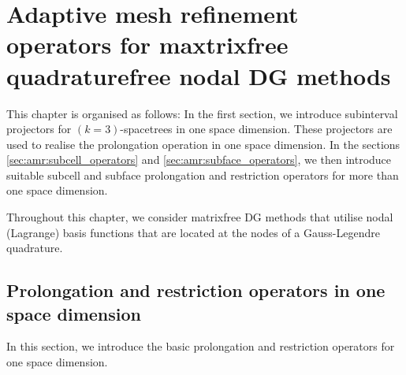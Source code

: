 \documentclass{scrreprt}
\theoremstyle{definition}
\theoremstyle{nonumberplain}
\begin{document}
\chapter{Adaptive mesh refinement operators for 
maxtrixfree quadraturefree nodal DG
methods}
\label{ch:amr}
This chapter is organised as follows:
In the first section, we introduce subinterval projectors
for $(k=3)$-spacetrees in one space dimension.
These projectors are used to realise the
prolongation operation in one space dimension.
In the sections \ref{sec:amr:subcell_operators}
and \ref{sec:amr:subface_operators},
we then introduce suitable subcell and subface
prolongation and restriction operators for more
than one space dimension.

Throughout this chapter, we consider matrixfree DG methods that utilise
nodal (Lagrange) basis functions that are located 
at the nodes of a Gauss-Legendre quadrature.
\section{Prolongation and restriction operators in one
space dimension}
In this section, we introduce the basic prolongation
and restriction operators for one space dimension.
\end{document}
